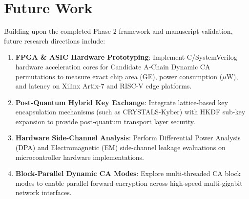 \section{Future Work}
\label{sec:future_work}

Building upon the completed Phase 2 framework and manuscript validation, future research directions include:

\begin{enumerate}
    \item \textbf{FPGA & ASIC Hardware Prototyping}: Implement C/SystemVerilog hardware acceleration cores for Candidate A-Chain Dynamic CA permutations to measure exact chip area (GE), power consumption ($\mu\text{W}$), and latency on Xilinx Artix-7 and RISC-V edge platforms.
    \item \textbf{Post-Quantum Hybrid Key Exchange}: Integrate lattice-based key encapsulation mechanisms (such as CRYSTALS-Kyber) with HKDF sub-key expansion to provide post-quantum transport layer security.
    \item \textbf{Hardware Side-Channel Analysis}: Perform Differential Power Analysis (DPA) and Electromagnetic (EM) side-channel leakage evaluations on microcontroller hardware implementations.
    \item \textbf{Block-Parallel Dynamic CA Modes}: Explore multi-threaded CA block modes to enable parallel forward encryption across high-speed multi-gigabit network interfaces.
\end{enumerate}
